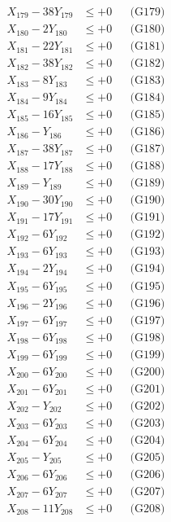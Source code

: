 \documentclass[a4paper,10pt]{article}
\begin{document}
{\begin{align}
X_{179} - 38Y_{179} &\leq +0 && \text{(G179)} \\
X_{180} - 2Y_{180} &\leq +0 && \text{(G180)} \\
X_{181} - 22Y_{181} &\leq +0 && \text{(G181)} \\
X_{182} - 38Y_{182} &\leq +0 && \text{(G182)} \\
X_{183} - 8Y_{183} &\leq +0 && \text{(G183)} \\
X_{184} - 9Y_{184} &\leq +0 && \text{(G184)} \\
X_{185} - 16Y_{185} &\leq +0 && \text{(G185)} \\
X_{186} - Y_{186} &\leq +0 && \text{(G186)} \\
X_{187} - 38Y_{187} &\leq +0 && \text{(G187)} \\
\allowbreak
X_{188} - 17Y_{188} &\leq +0 && \text{(G188)} \\
X_{189} - Y_{189} &\leq +0 && \text{(G189)} \\
X_{190} - 30Y_{190} &\leq +0 && \text{(G190)} \\
X_{191} - 17Y_{191} &\leq +0 && \text{(G191)} \\
X_{192} - 6Y_{192} &\leq +0 && \text{(G192)} \\
X_{193} - 6Y_{193} &\leq +0 && \text{(G193)} \\
X_{194} - 2Y_{194} &\leq +0 && \text{(G194)} \\
X_{195} - 6Y_{195} &\leq +0 && \text{(G195)} \\
X_{196} - 2Y_{196} &\leq +0 && \text{(G196)} \\
X_{197} - 6Y_{197} &\leq +0 && \text{(G197)} \\
\allowbreak
X_{198} - 6Y_{198} &\leq +0 && \text{(G198)} \\
X_{199} - 6Y_{199} &\leq +0 && \text{(G199)} \\
X_{200} - 6Y_{200} &\leq +0 && \text{(G200)} \\
X_{201} - 6Y_{201} &\leq +0 && \text{(G201)} \\
X_{202} - Y_{202} &\leq +0 && \text{(G202)} \\
X_{203} - 6Y_{203} &\leq +0 && \text{(G203)} \\
X_{204} - 6Y_{204} &\leq +0 && \text{(G204)} \\
X_{205} - Y_{205} &\leq +0 && \text{(G205)} \\
X_{206} - 6Y_{206} &\leq +0 && \text{(G206)} \\
X_{207} - 6Y_{207} &\leq +0 && \text{(G207)} \\
\allowbreak
X_{208} - 11Y_{208} &\leq +0 && \text{(G208)} \\

\end{align}}
\end{document}
